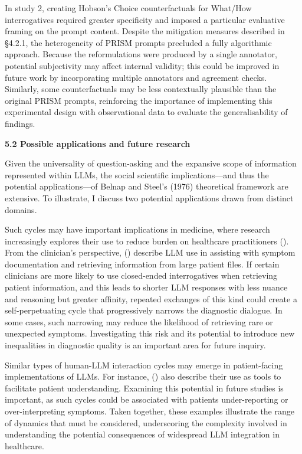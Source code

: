 \documentclass[
  12pt,
]{article}
\begin{document}
In study 2, creating Hobson's Choice counterfactuals for What/How interrogatives required greater specificity and imposed a particular evaluative framing on the prompt content. Despite the mitigation measures described in §4.2.1, the heterogeneity of PRISM prompts precluded a fully algorithmic approach. Because the reformulations were produced by a single annotator, potential subjectivity may affect internal validity; this could be improved in future work by incorporating multiple annotators and agreement checks. Similarly, some counterfactuals may be less contextually plausible than the original PRISM prompts, reinforcing the importance of implementing this experimental design with observational data to evaluate the generalisability of findings.

\textbf{5.2 Possible applications and future research}

Given the universality of question-asking and the expansive scope of information represented within LLMs, the social scientific implications---and thus the potential applications---of Belnap and Steel's (1976) theoretical framework are extensive. To illustrate, I discuss two potential applications drawn from distinct domains.

Such cycles may have important implications in medicine, where research increasingly explores their use to reduce burden on healthcare practitioners (). From the clinician's perspective, () describe LLM use in assisting with symptom documentation and retrieving information from large patient files. If certain clinicians are more likely to use closed-ended interrogatives when retrieving patient information, and this leads to shorter LLM responses with less nuance and reasoning but greater affinity, repeated exchanges of this kind could create a self-perpetuating cycle that progressively narrows the diagnostic dialogue. In some cases, such narrowing may reduce the likelihood of retrieving rare or unexpected symptoms. Investigating this risk and its potential to introduce new inequalities in diagnostic quality is an important area for future inquiry.

Similar types of human-LLM interaction cycles may emerge in patient-facing implementations of LLMs. For instance, () also describe their use as tools to facilitate patient understanding. Examining this potential in future studies is important, as such cycles could be associated with patients under-reporting or over-interpreting symptoms. Taken together, these examples illustrate the range of dynamics that must be considered, underscoring the complexity involved in understanding the potential consequences of widespread LLM integration in healthcare.
\end{document}
